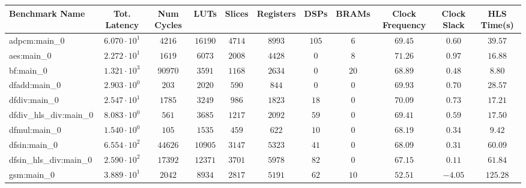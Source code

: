 \begin{tabular}{|l|c|c|c|c|c|c|c|c|c|c|}
\hline
Benchmark Name          & Tot. Latency           & Num Cycles & LUTs      & Slices    & Registers & DSPs    & BRAMs   & Clock Frequency & Clock Slack & HLS Time(s) \\
\hline
adpcm:main\_0           & $ 6.070 \cdot 10^{1} $ & $ 4216   $ & $ 16190 $ & $ 4714  $ & $ 8993  $ & $ 105 $ & $ 6   $ & $ 69.45       $ & $ 0.60    $ & $ 39.57   $ \\
aes:main\_0             & $ 2.272 \cdot 10^{1} $ & $ 1619   $ & $ 6073  $ & $ 2008  $ & $ 4428  $ & $ 0   $ & $ 8   $ & $ 71.26       $ & $ 0.97    $ & $ 16.88   $ \\
bf:main\_0              & $ 1.321 \cdot 10^{3} $ & $ 90970  $ & $ 3591  $ & $ 1168  $ & $ 2634  $ & $ 0   $ & $ 20  $ & $ 68.89       $ & $ 0.48    $ & $ 8.80    $ \\
dfadd:main\_0           & $ 2.903 \cdot 10^{0} $ & $ 203    $ & $ 2020  $ & $ 590   $ & $ 844   $ & $ 0   $ & $ 0   $ & $ 69.93       $ & $ 0.70    $ & $ 28.57   $ \\
dfdiv:main\_0           & $ 2.547 \cdot 10^{1} $ & $ 1785   $ & $ 3249  $ & $ 986   $ & $ 1823  $ & $ 18  $ & $ 0   $ & $ 70.09       $ & $ 0.73    $ & $ 17.21   $ \\
dfdiv\_hls\_div:main\_0 & $ 8.083 \cdot 10^{0} $ & $ 561    $ & $ 3685  $ & $ 1217  $ & $ 2092  $ & $ 59  $ & $ 0   $ & $ 69.41       $ & $ 0.59    $ & $ 17.50   $ \\
dfmul:main\_0           & $ 1.540 \cdot 10^{0} $ & $ 105    $ & $ 1535  $ & $ 459   $ & $ 622   $ & $ 10  $ & $ 0   $ & $ 68.19       $ & $ 0.34    $ & $ 9.42    $ \\
dfsin:main\_0           & $ 6.554 \cdot 10^{2} $ & $ 44626  $ & $ 10905 $ & $ 3147  $ & $ 5323  $ & $ 41  $ & $ 0   $ & $ 68.09       $ & $ 0.31    $ & $ 60.09   $ \\
dfsin\_hls\_div:main\_0 & $ 2.590 \cdot 10^{2} $ & $ 17392  $ & $ 12371 $ & $ 3701  $ & $ 5978  $ & $ 82  $ & $ 0   $ & $ 67.15       $ & $ 0.11    $ & $ 61.84   $ \\
gsm:main\_0             & $ 3.889 \cdot 10^{1} $ & $ 2042   $ & $ 8934  $ & $ 2817  $ & $ 5191  $ & $ 62  $ & $ 10  $ & $ 52.51       $ & $ -4.05   $ & $ 125.28  $ \\

\end{tabular}
